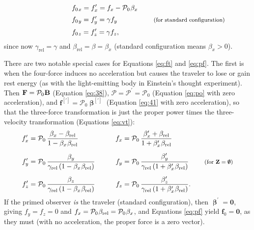 \documentclass[12pt]{article}
\renewcommand{\vv}[1]{\mathbf{#1}}
\newcommand{\vvbeta}{\bm{\upbeta}}
\begin{document}
\begin{equation}\label{eq:pf}
\begin{aligned}
\qquad \qquad \qquad & f_{0 \mkern1.5mu x} = f_x^\prime = f_x - \mathcal{P}_0 \mkern1mu \beta_x \\[2pt]
& f_{0 \mkern1.5mu y} = f_y^\prime = \gamma f_y \qquad \qquad \quad \textrm{\footnotesize{ (for standard configuration)}} \\[2pt]
& f_{0 \mkern1.5mu z} = f_z^\prime = \gamma f_z ,
\end{aligned}
\end{equation}
since now $\gamma_{\textrm{rel}} = \gamma$ and $\beta_{\textrm{rel}} = \beta = \beta_x$ (standard configuration means $\beta_x > 0$).

There are two notable special cases for Equations \ref{eq:ft} and \ref{eq:pf}. The first is when the four-force induces no acceleration but causes the traveler to lose or gain rest energy (as with the light-emitting body in Einstein's thought experiment). Then $\vv F = \mathcal{P}_0 \mkern.5mu \vv B$ (Equation \ref{eq:38}), $\mathcal{P} = \mathcal{P}^\prime = \mathcal{P}_0$ (Equation \ref{eq:po} with zero acceleration), and $\vv f^{[\prime]} = \mathcal{P}_0 \vvbeta^{[\prime]}$ (Equation \ref{eq:41} with zero acceleration), so that the three-force transformation is just the proper power times the three-velocity transformation (Equations \ref{eq:vt}):
\begin{equation*}
\begin{aligned}
f_x^{\prime} &= \mathcal{P}_0 \, \frac{\beta_x - \beta_{\textrm{rel}}}{1 - \beta_{x} \mkern1mu \beta_{\textrm{rel}}} & f_x &= \mathcal{P}_0 \, \frac{\beta_x^{\prime} + \beta_{\textrm{rel}}}{1 + \beta_x^{\prime} \mkern1mu \beta_{\textrm{rel}}}\\[5pt]
f_y^{\prime} &= \mathcal{P}_0 \, \frac{\beta_y}{\gamma_{\textrm{rel}} \left( 1 - \beta_{x} \mkern1mu \beta_{\textrm{rel}} \right)}& \qquad f_y &= \mathcal{P}_0 \, \frac{\beta_y^{\prime}}{\gamma_{\textrm{rel}} \left( 1 + \beta_x^{\prime} \mkern1mu \beta_{\textrm{rel}} \right) } \qquad \textrm{\footnotesize{ (for $\vv Z = \textrm{\mbox{\boldmath $\emptyset$}}$)}}\\[5pt]
f_z^{\prime} &= \mathcal{P}_0 \, \frac{\beta_z}{\gamma_{\textrm{rel}} \left( 1 - \beta_{x} \mkern1mu \beta_{\textrm{rel}} \right)}& f_z &= \mathcal{P}_0 \, \frac{\beta_z^{\prime}}{\gamma_{\textrm{rel}} \left( 1 + \beta_x^{\prime} \mkern1mu \beta_{\textrm{rel}} \right)}.
\end{aligned}
\end{equation*}
If the primed observer \emph{is} the traveler (standard configuration), then $\vvbeta^\prime = \vv 0$, giving $f_y = f_z = 0$ and $f_x = \mathcal{P}_0 \mkern1mu \beta_{\mathrm{rel}} = \mathcal{P}_0 \mkern1mu \beta_x$, and Equations \ref{eq:pf} yield $\vv f_0 = \vv 0$, as they must (with no acceleration, the proper force is a zero vector).
\end{document}
